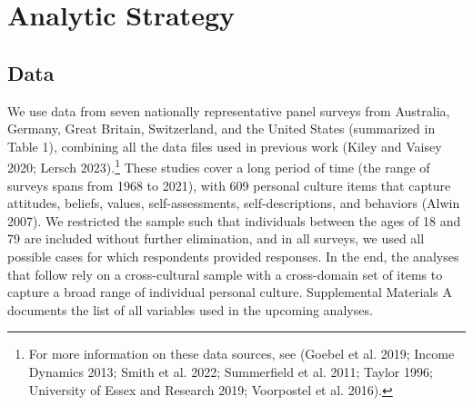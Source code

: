 \documentclass[
  12pt,
]{article}
\begin{document}
\hypertarget{analytic-strategy}{%
\section{Analytic Strategy}\label{analytic-strategy}}

\hypertarget{data}{%
\subsection{Data}\label{data}}

We use data from seven nationally representative panel surveys from
Australia, Germany, Great Britain, Switzerland, and the United States
(summarized in Table 1), combining all the data files used in previous
work (Kiley and Vaisey 2020; Lersch 2023).\footnote{For more information
  on these data sources, see (Goebel et al. 2019; Income Dynamics 2013;
  Smith et al. 2022; Summerfield et al. 2011; Taylor 1996; University of
  Essex and Research 2019; Voorpostel et al. 2016).} These studies cover
a long period of time (the range of surveys spans from 1968 to 2021),
with 609 personal culture items that capture attitudes, beliefs, values,
self-assessments, self-descriptions, and behaviors (Alwin 2007). We
restricted the sample such that individuals between the ages of 18 and
79 are included without further elimination, and in all surveys, we used
all possible cases for which respondents provided responses. In the end,
the analyses that follow rely on a cross-cultural sample with a
cross-domain set of items to capture a broad range of individual
personal culture. Supplemental Materials A documents the list of all
variables used in the upcoming analyses.

\begin{table}[H]

\caption{\label{tab:unnamed-chunk-1}The Description of the Data Sources}
\centering
{}
\end{table}
\end{document}
